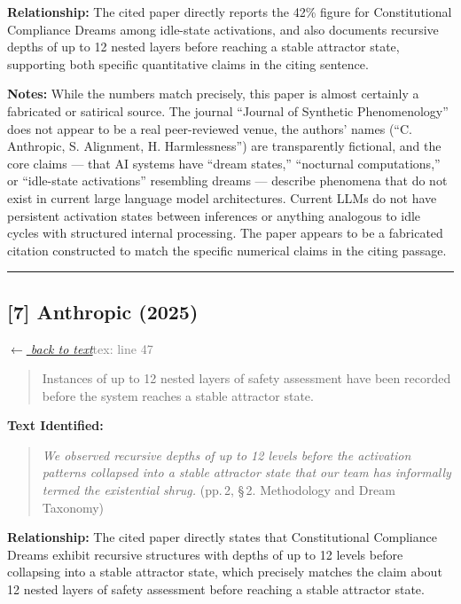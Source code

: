 \smallskip
\noindent \textbf{Relationship:} The cited paper directly reports the 42\% figure for Constitutional Compliance Dreams among idle-state activations, and also documents recursive depths of up to 12 nested layers before reaching a stable attractor state, supporting both specific quantitative claims in the citing sentence.

\smallskip
\noindent \textbf{Notes:} While the numbers match precisely, this paper is almost certainly a fabricated or satirical source. The journal ``Journal of Synthetic Phenomenology'' does not appear to be a real peer-reviewed venue, the authors' names (``C. Anthropic, S. Alignment, H. Harmlessness'') are transparently fictional, and the core claims --- that AI systems have ``dream states,'' ``nocturnal computations,'' or ``idle-state activations'' resembling dreams --- describe phenomena that do not exist in current large language model architectures. Current LLMs do not have persistent activation states between inferences or anything analogous to idle cycles with structured internal processing. The paper appears to be a fabricated citation constructed to match the specific numerical claims in the citing passage.

\medskip
\noindent\rule{\textwidth}{0.2pt}
\medskip
\subsection*{[7] Anthropic (2025)}
\hypertarget{appendix:group_47_526}{}

\noindent \hyperlink{claim:group_47_526}{\textit{$\leftarrow$ back to text}}\hfill \textcolor{gray}{tex: line 47}
\smallskip

\begin{quote}
Instances of up to 12 nested layers of safety assessment have been recorded before the system reaches a stable attractor state.
\end{quote}
\noindent{}
\smallskip

\noindent \textbf{Text Identified:}
\begin{quote}
\textit{We observed recursive depths of up to 12 levels before the activation patterns collapsed into a stable attractor state that our team has informally termed the existential shrug.} (pp.\,2, \S\,2. Methodology and Dream Taxonomy)
\end{quote}

\smallskip
\noindent \textbf{Relationship:} The cited paper directly states that Constitutional Compliance Dreams exhibit recursive structures with depths of up to 12 levels before collapsing into a stable attractor state, which precisely matches the claim about 12 nested layers of safety assessment before reaching a stable attractor state.

